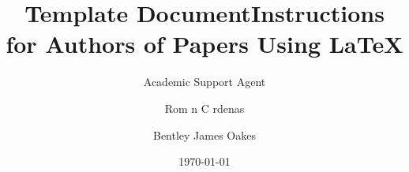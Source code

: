 \documentclass{article}
\title{Template Document}
\author{Academic Support Agent}
\date{\today}
\begin{document}
\maketitle

%
%

\def\SCSconferencename{Annual Modeling and Simulation Conference}

\def\SCSconferenceacro{ANNSIM'25}

\def\SCSpublicationyear{2025}

\def\SCSconferenceeditors{J.L. Risco-Mart n, G. Rabadi, D. Cetinkaya, R. C rdenas, S. Ferrero-Losada, and A.A. Abdelnabi}

\def\SCSconferencedates{May 26-29}

\def\SCSconferencevenue{Universidad Complutense de Madrid, Madrid, Spain}

\title{Instructions for Authors of Papers Using \LaTeX}

\author[\authorrefmark{1} \authorrefmark{2}]{Rom n C rdenas}
\author[\authorrefmark{3}]{Bentley James Oakes}


\end{document}
